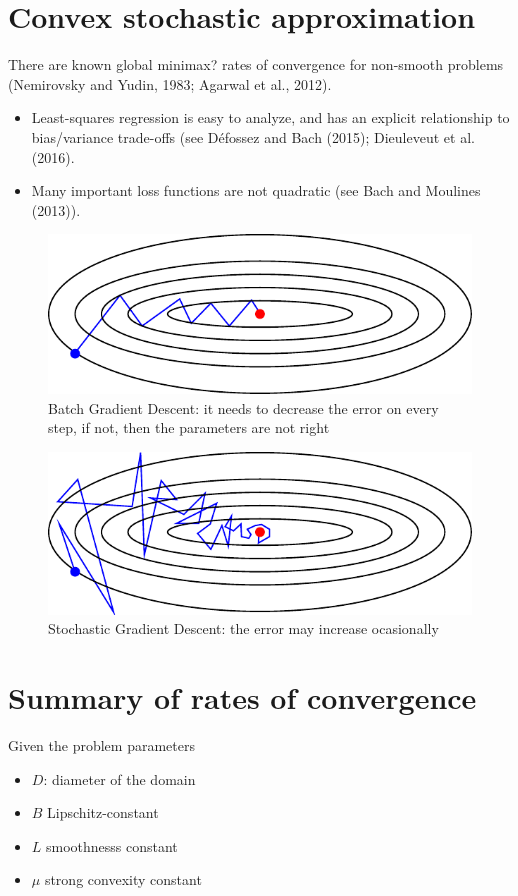 \documentclass[b5paper]{report}
\begin{document}
\section{Convex stochastic approximation}

There are known global minimax? rates of convergence for non-smooth problems
(Nemirovsky and Yudin, 1983; Agarwal et al., 2012).


\begin{itemize}
  \item Least-squares regression is easy to analyze, and has an explicit
    relationship to bias/variance trade-offs (see Défossez and Bach (2015);
      Dieuleveut et al. (2016).
  \item Many important loss functions are not quadratic (see Bach and Moulines
    (2013)).
\end{itemize}

\begin{figure}[h]
  \centering
  \includegraphics[width=.5\textwidth]{figures/optimization/optimization_batch_gd}
  \caption{Batch Gradient Descent: it needs to decrease the error on every
  step, if not, then the parameters are not right}
\end{figure}

\begin{figure}[h]
  \centering
  \includegraphics[width=.5\textwidth]{figures/optimization/optimization_stochastic_gd}
  \caption{Stochastic Gradient Descent: the error may increase ocasionally}
\end{figure}

\section{Summary of rates of convergence}

Given the problem parameters

\begin{itemize}
  \item $D$: diameter of the domain
  \item $B$ Lipschitz-constant
  \item $L$ smoothnesss constant
  \item $\mu$ strong convexity constant
\end{itemize}
\end{document}
